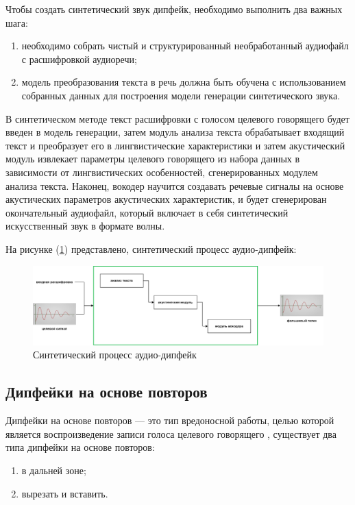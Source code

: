 Чтобы создать синтетический звук дипфейк, необходимо выполнить два важных шага:

\begin{enumerate}
    \item необходимо собрать чистый и структурированный необработанный аудиофайл с расшифровкой аудиоречи;
    \item модель преобразования текста в речь должна быть обучена с использованием собранных данных для построения модели генерации синтетического звука.
\end{enumerate}

В синтетическом методе текст расшифровки с голосом целевого говорящего будет введен в модель генерации, затем модуль анализа текста обрабатывает входящий текст и преобразует его в лингвистические характеристики и затем акустический модуль извлекает параметры целевого говорящего из набора данных в зависимости от лингвистических особенностей, сгенерированных модулем анализа текста. Наконец, вокодер научится создавать речевые сигналы на основе акустических параметров акустических характеристик, и будет сгенерирован окончательный аудиофайл, который включает в себя синтетический искусственный звук в формате волны.

На рисунке (\ref{fig:synth-deepfake}) представлено, синтетический процесс аудио-дипфейк: 
\begin{figure}[H]
	\centering
	\includegraphics[width=0.8\linewidth]{images/synthetic-based.png}
	\caption{Синтетический процесс аудио-дипфейк}
	\label{fig:synth-deepfake}
\end{figure}

\subsection{Дипфейки на основе повторов}

Дипфейки на основе повторов — это тип вредоносной работы, целью которой является воспроизведение записи голоса целевого говорящего \cite{replay-based-deepfake}, существует два типа дипфейки на основе повторов:

\begin{enumerate}
    \item в дальней зоне;
    \item вырезать и вставить.
\end{enumerate}

